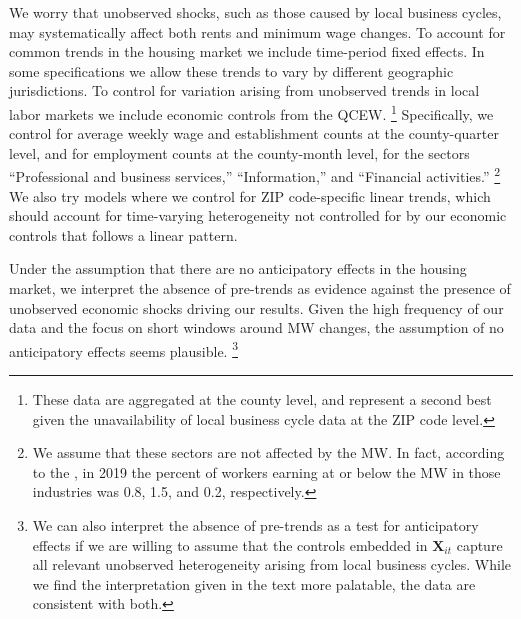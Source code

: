 We worry that unobserved shocks, such as those caused by local business cycles, 
may systematically affect both rents and minimum wage changes.
To account for common trends in the housing market we include time-period 
fixed effects.
In some specifications we allow these trends to vary by different geographic 
jurisdictions.
To control for variation arising from unobserved trends in local labor markets 
we include economic controls from the QCEW.%
\footnote{These data are aggregated at the county level, and represent a second 
best given the unavailability of local business cycle data at the ZIP code 
level.}
Specifically, we control for average weekly wage and establishment counts at the 
county-quarter level, and for employment counts at the county-month level, 
for the sectors ``Professional and business services,'' ``Information,'' and 
``Financial activities.''%
\footnote{We assume that these sectors are not affected by the MW.
In fact, according to the \textcite[][Table 5]{MinWorkersReportBLS}, in 
2019 the percent of workers earning at or below the MW in those 
industries was 0.8, 1.5, and 0.2, respectively.}
We also try models where we control for ZIP code-specific linear
trends, which should account for time-varying heterogeneity not controlled for 
by our economic controls that follows a linear pattern.

Under the assumption that there are no anticipatory effects in the housing 
market, we interpret the absence of pre-trends as evidence against the presence 
of unobserved economic shocks driving our results.
Given the high frequency of our data and the focus on short windows around 
MW changes, the assumption of no anticipatory effects seems plausible.%
\footnote{We can also interpret the absence of pre-trends as a test for 
anticipatory effects if we are willing to assume that the controls embedded in 
$\mathbf{X}_{it}$ capture all relevant unobserved heterogeneity arising from 
local business cycles.
While we find the interpretation given in the text more palatable, the data are 
consistent with both.}

